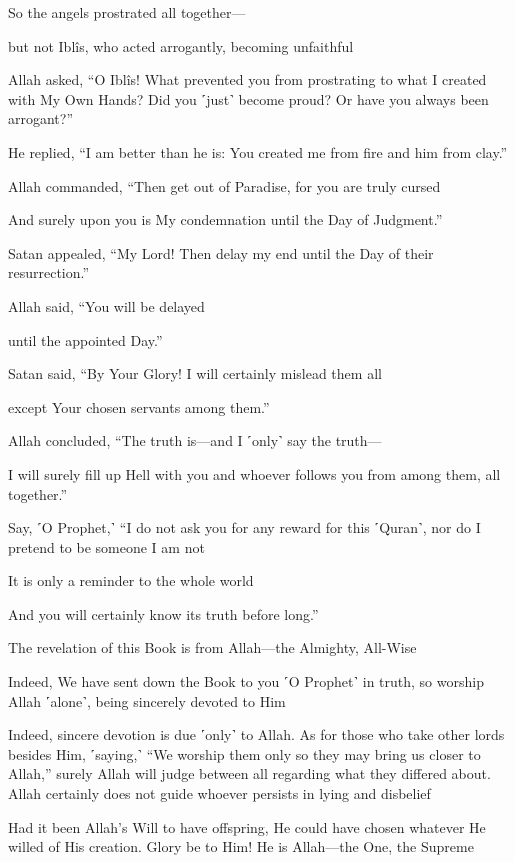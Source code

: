 So the angels prostrated all together—

but not Iblîs, who acted arrogantly, becoming unfaithful

Allah asked, “O Iblîs! What prevented you from prostrating to what I created with My Own Hands? Did you ˹just˺ become proud? Or have you always been arrogant?”

He replied, “I am better than he is: You created me from fire and him from clay.”

Allah commanded, “Then get out of Paradise, for you are truly cursed

And surely upon you is My condemnation until the Day of Judgment.”

Satan appealed, “My Lord! Then delay my end until the Day of their resurrection.”

Allah said, “You will be delayed

until the appointed Day.”

Satan said, “By Your Glory! I will certainly mislead them all

except Your chosen servants among them.”

Allah concluded, “The truth is—and I ˹only˺ say the truth—

I will surely fill up Hell with you and whoever follows you from among them, all together.”

Say, ˹O Prophet,˺ “I do not ask you for any reward for this ˹Quran˺, nor do I pretend to be someone I am not

It is only a reminder to the whole world

And you will certainly know its truth before long.”

The revelation of this Book is from Allah—the Almighty, All-Wise

Indeed, We have sent down the Book to you ˹O Prophet˺ in truth, so worship Allah ˹alone˺, being sincerely devoted to Him

Indeed, sincere devotion is due ˹only˺ to Allah. As for those who take other lords besides Him, ˹saying,˺ “We worship them only so they may bring us closer to Allah,” surely Allah will judge between all regarding what they differed about. Allah certainly does not guide whoever persists in lying and disbelief

Had it been Allah’s Will to have offspring, He could have chosen whatever He willed of His creation. Glory be to Him! He is Allah—the One, the Supreme

